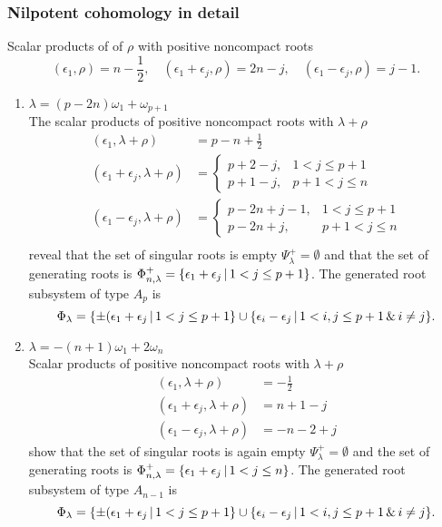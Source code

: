 \subsubsection{Nilpotent cohomology in detail}

Scalar products of of $\rho$ with positive noncompact roots
\begin{equation}\label{eq:Bn_rho_scalar_posroots}
  (\epsilon_1, \rho) = n - \frac{1}{2}, \quad (\epsilon_1 + \epsilon_j, \rho)  =  2n-j, \quad (\epsilon_1 - \epsilon_j, \rho)  =  j - 1.
\end{equation}

\begin{enumerate}
 \item $\lambda = (p-2n) \omega_1 + \omega_{p+1}$\\
      The scalar products of positive noncompact roots with $\lambda+\rho$
      \begin{align*}
	(\epsilon_1, \lambda+\rho) &= p-n+\frac{1}{2} \\
	(\epsilon_1+\epsilon_j,\lambda+\rho) &= \begin{cases}
						p+2-j, &  1<j\leq p+1\\
						p+1-j, &   p+1 <j \leq n 
	                                       \end{cases}\\
	(\epsilon_1-\epsilon_j,\lambda+\rho) &= \begin{cases}
						p-2n+j-1, &  1<j\leq p+1\\
						p-2n+j, &   p+1 <j \leq n
	                                       \end{cases}\\
      \end{align*}
      reveal that the set of singular roots is empty $\Psi^+_\lambda = \emptyset$ and that the set of generating roots is $\Phi^+_{n,\lambda} = \{\epsilon_1 + \epsilon_j \,|\, 1<j\leq p+1 \}$. The generated root subsystem of type $A_p$ is
      \[
	\Phi_\lambda = \{ \pm(\epsilon_1 + \epsilon_j \,|\, 1<j\leq p+1 \} \cup \{ \epsilon_i - \epsilon_j \,|\, 1 < i,j \leq p+1 \,\&\, i\neq j \}.
      \]
      
 \item $\lambda = -(n+1)\omega_1 + 2\omega_n $\\
    Scalar products of positive noncompact roots with $\lambda+\rho$
      \begin{align*}
	(\epsilon_1, \lambda+\rho) &= -\frac{1}{2} \\
	(\epsilon_1+\epsilon_j,\lambda+\rho) &=  n+1-j \\
	(\epsilon_1-\epsilon_j,\lambda+\rho) &= -n-2+j
      \end{align*}
    show that the set of singular roots is again empty $\Psi^+_\lambda = \emptyset$ and the set of generating roots is $\Phi^+_{n,\lambda} = \{\epsilon_1 + \epsilon_j \,|\, 1<j\leq n \}$. The generated root subsystem of type $A_{n-1}$ is
    \[
      \Phi_\lambda = \{ \pm(\epsilon_1 + \epsilon_j \,|\, 1<j\leq p+1 \} \cup \{ \epsilon_i - \epsilon_j \,|\, 1 < i,j \leq p+1 \,\&\, i\neq j \}.
    \]
      

\end{enumerate}
